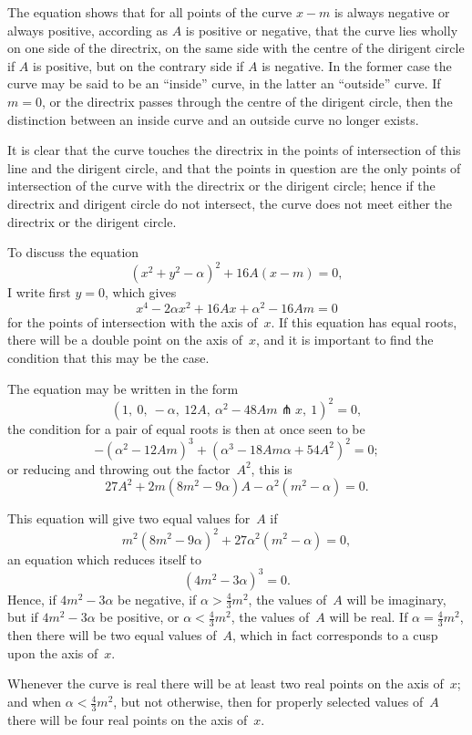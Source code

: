 \documentclass[11pt,a4paper]{book}
\begin{document}
\begin{center}
The equation shows that for all points of the curve $x - m$
is always negative or always positive, according as $A$ is
positive or negative, \ie{} that the curve lies wholly on one side
of the directrix, \viz{} on the same side with the centre of
the dirigent circle if $A$ is positive, but on the contrary side
if $A$ is negative. In the former case the curve may be said
to be an ``inside'' curve, in the latter an ``outside'' curve.
If $m = 0$, or the directrix passes through the centre of the
dirigent circle, then the distinction between an inside curve
and an outside curve no longer exists.

It is clear that the curve touches the directrix in the points
of intersection of this line and the dirigent circle, and that
the points in question are the only points of intersection of
the curve with the directrix or the dirigent circle; hence if
the directrix and dirigent circle do not intersect, the curve
does not meet either the directrix or the dirigent circle.

To discuss the equation
\[
(x^{2} + y^{2} - \alpha)^{2} + 16A(x - m) = 0,
\]
I write first $y = 0$, which gives
\[
x^{4} - 2\alpha x^{2} + 16Ax + \alpha^{2} - 16Am = 0
\]
for the points of intersection with the axis of~$x$.
If this equation has equal roots, there will be a double point
on the axis of~$x$, and it is important to find the condition
that this may be the case.

The equation may be written in the form
\[
(1,\ 0,\ -\alpha,\ 12A,\ \alpha^{2} - 48Am \pitchfork x,\ 1)^{2} = 0,
\]
the condition for a pair of equal roots is then at once seen to be
\[
-(\alpha^{2} - 12Am)^{3} + (\alpha^{3} - 18A m \alpha + 54A^{2})^{2} = 0;
\]
or reducing and throwing out the factor~$A^{2}$,
this is
\[
27A^{2} + 2m(8m^{2} - 9\alpha)A - \alpha^{2}(m^{2} - \alpha) = 0.
\]

This equation will give two equal values for~$A$ if
\[
m^{2}(8m^{2} - 9\alpha)^{2} + 27\alpha^{2}(m^{2} - \alpha) = 0,
\]
an equation which reduces itself to
\[
(4m^{2} - 3\alpha)^{3} = 0.
\]
Hence, if $4m^{2} - 3\alpha$ be negative, \ie{} if $\alpha > \tfrac{4}{3}m^{2}$,
the values of~$A$ will be imaginary, but if $4m^{2} - 3\alpha$ be positive,
or $\alpha < \tfrac{4}{3}m^{2}$, the values of~$A$ will be real.
If $\alpha = \tfrac{4}{3}m^{2}$, then there will be two equal values of~$A$,
which in fact corresponds to a cusp upon the axis of~$x$.

Whenever the curve is real there will be at least two real
points on the axis of~$x$; and when $\alpha < \tfrac{4}{3}m^{2}$, but not
otherwise, then for properly selected values of~$A$ there will be
four real points on the axis of~$x$.


\end{center}
\end{document}
